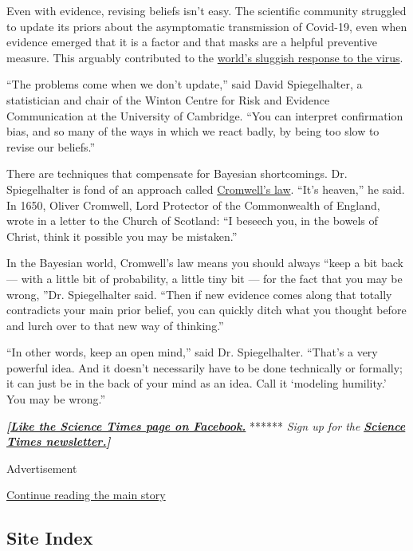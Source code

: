 Even with evidence, revising beliefs isn't easy. The scientific
community struggled to update its priors about the asymptomatic
transmission of Covid-19, even when evidence emerged that it is a factor
and that masks are a helpful preventive measure. This arguably
contributed to the
\href{https://www.nytimes.com/2020/06/27/world/europe/coronavirus-spread-asymptomatic.html?action=click\&module=RelatedLinks\&pgtype=Article}{world's
sluggish response to the virus}.

``The problems come when we don't update,'' said David Spiegelhalter, a
statistician and chair of the Winton Centre for Risk and Evidence
Communication at the University of Cambridge. ``You can interpret
confirmation bias, and so many of the ways in which we react badly, by
being too slow to revise our beliefs.''

There are techniques that compensate for Bayesian shortcomings. Dr.
Spiegelhalter is fond of an approach called
\href{https://understandinguncertainty.org/node/97}{Cromwell's law}.
``It's heaven,'' he said. In 1650, Oliver Cromwell, Lord Protector of
the Commonwealth of England, wrote in a letter to the Church of
Scotland: ``I beseech you, in the bowels of Christ, think it possible
you may be mistaken.''

In the Bayesian world, Cromwell's law means you should always ``keep a
bit back --- with a little bit of probability, a little tiny bit --- for
the fact that you may be wrong, ''Dr. Spiegelhalter said. ``Then if new
evidence comes along that totally contradicts your main prior belief,
you can quickly ditch what you thought before and lurch over to that new
way of thinking.''

``In other words, keep an open mind,'' said Dr. Spiegelhalter. ``That's
a very powerful idea. And it doesn't necessarily have to be done
technically or formally; it can just be in the back of your mind as an
idea. Call it `modeling humility.' You may be wrong.''

\textbf{\emph{{[}}\href{http://on.fb.me/1paTQ1h}{\emph{Like the Science
Times page on Facebook.}}} ****** \emph{\textbar{} Sign up for the}
\textbf{\href{http://nyti.ms/1MbHaRU}{\emph{Science Times
newsletter.}}\emph{{]}}}

Advertisement

\protect\hyperlink{after-bottom}{Continue reading the main story}

\hypertarget{site-index}{%
\subsection{Site Index}\label{site-index}}

